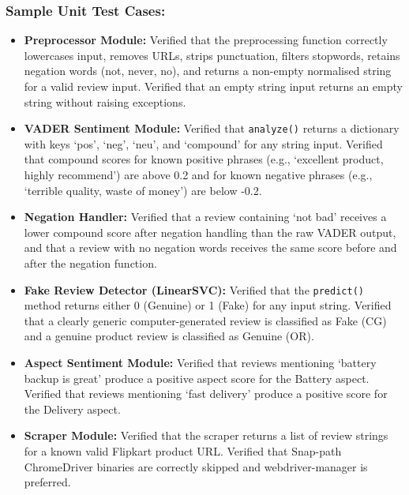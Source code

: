 \documentclass[12pt,a4paper]{report}
\begin{document}
\subsubsection*{Sample Unit Test Cases:}

\begin{itemize}
  \item \textbf{Preprocessor Module:} Verified that the preprocessing function correctly lowercases input, removes URLs, strips punctuation, filters stopwords, retains negation words (not, never, no), and returns a non-empty normalised string for a valid review input. Verified that an empty string input returns an empty string without raising exceptions.

  \item \textbf{VADER Sentiment Module:} Verified that \texttt{analyze()} returns a dictionary with keys `pos', `neg', `neu', and `compound' for any string input. Verified that compound scores for known positive phrases (e.g., `excellent product, highly recommend') are above 0.2 and for known negative phrases (e.g., `terrible quality, waste of money') are below -0.2.

  \item \textbf{Negation Handler:} Verified that a review containing `not bad' receives a lower compound score after negation handling than the raw VADER output, and that a review with no negation words receives the same score before and after the negation function.

  \item \textbf{Fake Review Detector (LinearSVC):} Verified that the \texttt{predict()} method returns either 0 (Genuine) or 1 (Fake) for any input string. Verified that a clearly generic computer-generated review is classified as Fake (CG) and a genuine product review is classified as Genuine (OR).

  \item \textbf{Aspect Sentiment Module:} Verified that reviews mentioning `battery backup is great' produce a positive aspect score for the Battery aspect. Verified that reviews mentioning `fast delivery' produce a positive score for the Delivery aspect.

  \item \textbf{Scraper Module:} Verified that the scraper returns a list of review strings for a known valid Flipkart product URL. Verified that Snap-path ChromeDriver binaries are correctly skipped and webdriver-manager is preferred.
\end{itemize}
\end{document}
